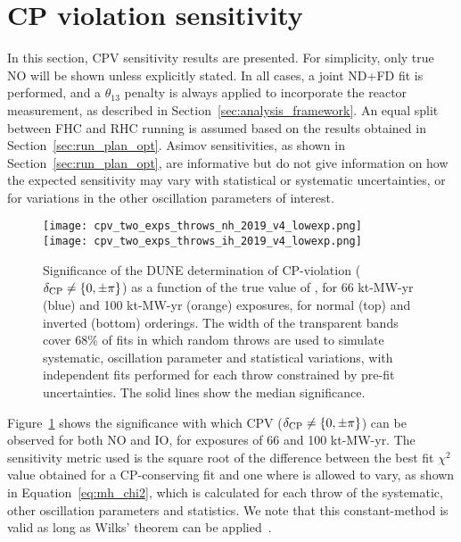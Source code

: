 \FloatBarrier
\section{CP violation sensitivity}
\label{sec:cp_sens}

In this section, CPV sensitivity results are presented. For simplicity, only true NO will be shown unless explicitly stated. In all cases, a joint ND+FD fit is performed, and a $\theta_{13}$ penalty is always applied to incorporate the reactor measurement, as described in Section~\ref{sec:analysis_framework}. An equal split between FHC and RHC running is assumed based on the results obtained in Section~\ref{sec:run_plan_opt}. Asimov sensitivities, as shown in Section~\ref{sec:run_plan_opt}, are informative but do not give information on how the expected sensitivity may vary with statistical or systematic uncertainties, or for variations in the other oscillation parameters of interest.

\begin{figure}[htbp]
  \centering
  \texttt{[image: cpv\_two\_exps\_throws\_nh\_2019\_v4\_lowexp.png]}\\
  \texttt{[image: cpv\_two\_exps\_throws\_ih\_2019\_v4\_lowexp.png]}
  \caption{Significance of the DUNE determination of CP-violation ($\delta_{\rm CP} \neq \{0,\pm\pi\}$) as a function of the true value of \deltacp, for 66 kt-MW-yr (blue) and 100 kt-MW-yr (orange) exposures, for normal (top) and inverted (bottom) orderings. The width of the transparent bands cover 68\% of fits in which random throws are used to simulate systematic, oscillation parameter and statistical variations, with independent fits performed for each throw constrained by pre-fit uncertainties. The solid lines show the median significance.}
  \label{fig:cpv_bands}
\end{figure}
Figure~\ref{fig:cpv_bands} shows the significance with which CPV ($\delta_{\rm CP} \neq \{0,\pm\pi\}$) can be observed for both NO and IO, for exposures of 66 and 100 kt-MW-yr.  The sensitivity metric used is the square root of the difference between the best fit $\chi^{2}$ value obtained for a CP-conserving fit and one where \deltacp is allowed to vary, as shown in Equation~\ref{eq:mh_chi2}, which is calculated for each throw of the systematic, other oscillation parameters and statistics. We note that this constant-\dchisq method is valid as long as Wilks' theorem can be applied~\cite{wilks}.

